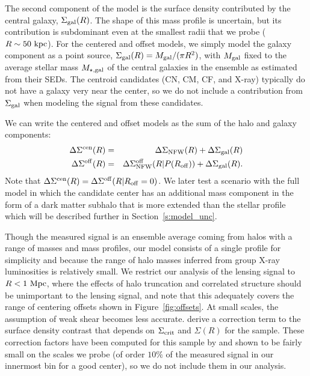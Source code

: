 \documentclass[12pt]{emulateapj}
\begin{document}
The second component of the model is the surface density contributed by
the central galaxy, $\Sigma_{\rm gal}(R)$. The shape of this mass
profile is uncertain, but its contribution is subdominant even
at the smallest radii that we probe ($R\sim50~{\rm
  kpc}$). For the centered and offset models, we simply
model the galaxy component as a point source, $\Sigma_{\rm gal}(R)=M_{\rm gal}/(\pi
R^2)$, with $M_{\rm gal}$ fixed to the average stellar mass $M_{\rm
  \star,gal}$ of the central galaxies in the ensemble as estimated
from their SEDs. The centroid candidates (CN, CM, CF, and
X-ray) typically do not have a galaxy very near the center, so we do
not include a contribution from $\Sigma_{\rm gal}$ when modeling the
signal from these candidates.

We can write the centered and offset models as the sum of the halo and
galaxy components:
\begin{eqnarray}
\Delta\Sigma^{\rm cen}(R) &=& \Delta\Sigma_{\rm NFW}(R) + \Delta\Sigma_{\rm gal}(R) \\
\Delta\Sigma^{\rm off}(R) &=& \Delta\Sigma_{\rm NFW}^{\rm off}(R|P(R_{\rm off})) + \Delta\Sigma_{\rm gal}(R).
\end{eqnarray}
Note that $\Delta\Sigma^{\rm cen}(R)=\Delta\Sigma^{\rm off}(R|R_{\rm
  off}=0)$.  We later test a scenario with the full model in which the
candidate center has an additional mass component in the form of a
dark matter subhalo that is more extended than the stellar profile
which will be described further in Section~\ref{s:model_unc}.

Though the measured signal is an
ensemble average coming from halos with a range of masses and mass
profiles, our model consists of a single profile for simplicity and
because the range of halo masses inferred from group X-ray
luminosities is relatively small. We restrict our analysis of the
lensing signal to $R<1~{\rm Mpc}$, where the effects of halo
truncation and correlated structure should be unimportant to the
lensing signal, and note that this adequately covers the range of
centering offsets shown in Figure~\ref{fig:offsets}.
At small scales, the assumption of weak shear becomes less
accurate. \citet{Mandelbaum2006b} derive a correction term to the
surface density contrast that depends on $\Sigma_{\rm crit}$ and
$\Sigma(R)$ for the sample. These correction factors have been
computed for this sample by \citet{Leauthaud2010} and shown to be
fairly small on the scales we probe (of order $10\%$ of the measured
signal in our innermost bin for a good center), so we do not include
them in our analysis.
\end{document}
